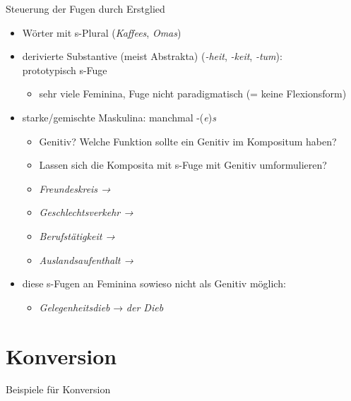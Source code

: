 \begin{frame}
  {Steuerung der Fugen durch Erstglied}
  \pause
  \begin{itemize}[<+->]
    \item Wörter mit s-Plural (\textit{Kaffees}, \textit{Omas}) 
      \Halbzeile
    \item \alert{derivierte} Substantive (meist Abstrakta) (\textit{-heit}, \textit{-keit}, \textit{-tum}):\\
      \alert{prototypisch s-Fuge}
      \begin{itemize}[<+->]
        \item sehr viele Feminina, Fuge nicht paradigmatisch (= keine Flexionsform)
      \end{itemize}
      \Halbzeile
    \item starke\slash gemischte Maskulina: manchmal -(\textit{e})\textit{s}
      \begin{itemize}[<+->]
        \item Genitiv? Welche Funktion sollte ein Genitiv im Kompositum haben?
        \item Lassen sich die Komposita mit s-Fuge mit Genitiv umformulieren?
        \item \textit{Freundeskreis → }
        \item \textit{Geschlechtsverkehr → }
        \item \textit{Berufstätigkeit → }
        \item \textit{Auslandsaufenthalt → }
      \end{itemize}
    \Halbzeile
  \item diese s-Fugen an \alert{Feminina} sowieso nicht als Genitiv möglich:
      \begin{itemize}
        \item \textit{Gelegenheitsdieb} → \textit{der Dieb }
      \end{itemize}
  \end{itemize}
\end{frame}

\section{Konversion}

\begin{frame}
  {Beispiele für Konversion}
  \pause
  \begin{exe}
    \pause
    \pause
    \pause
    \pause
    \pause
    \pause
    \pause
  \end{exe}
\end{frame}

